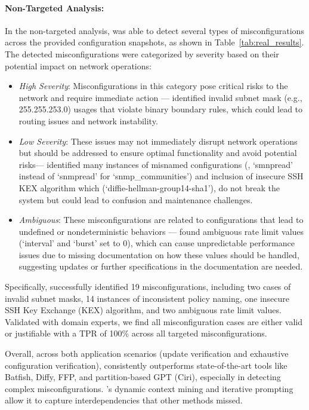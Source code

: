 \paragraph{Non-Targeted Analysis:}
In the non-targeted analysis, \sysname{} was able to detect several types of misconfigurations across the provided configuration snapshots, as shown in Table~\ref{tab:real_results}.
The detected misconfigurations were categorized by severity based on their potential impact on network operations:
\begin{itemize}
    \item \textit{High Severity}: Misconfigurations in this category pose critical risks to the network and require immediate action --- \sysname{} identified invalid subnet mask (e.g., 255.255.253.0) usages that violate binary boundary rules, which could lead to routing issues and network instability.
    \item \textit{Low Severity}: These issues may not immediately disrupt network operations but should be addressed to ensure optimal functionality and avoid potential risks---
    \sysname{} identified many instances of misnamed configurations (\eg, `smnpread' instead of `snmpread' for `snmp\_communities') and inclusion of insecure SSH KEX algorithm which (`diffie-hellman-group14-sha1'), do not break the system but could lead to confusion and maintenance challenges.
    \item \textit{Ambiguous}: These misconfigurations are related to configurations that lead to undefined or nondeterministic behaviors --- \sysname{} found ambiguous rate limit values (`interval' and `burst' set to 0), which can cause unpredictable performance issues due to missing documentation on how these values should be handled, suggesting updates or further specifications in the documentation are needed.
\end{itemize}

Specifically, \sysname{} successfully identified 19 misconfigurations, including two cases of invalid subnet masks, 14 instances of inconsistent policy naming, one insecure SSH Key Exchange (KEX) algorithm, and two ambiguous rate limit values. Validated with domain experts, we find all misconfiguration cases are either valid or justifiable with a TPR of 100\% across all targeted misconfigurations.

Overall, across both application scenarios (update verification and exhaustive configuration verification), \sysname{} consistently outperforms state-of-the-art tools like Batfish, Diffy, FFP, and partition-based GPT (Ciri), especially in detecting complex misconfigurations. \sysname{}'s dynamic context mining and iterative prompting allow it to capture interdependencies that other methods missed.